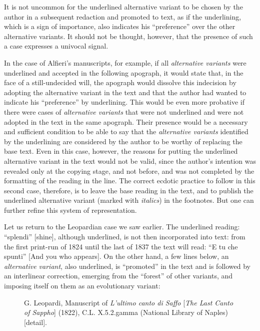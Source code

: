 \begin{paper}
It is not uncommon for the underlined alternative variant to be chosen
by the author in a subsequent redaction and promoted to text, as if the
underlining, which is a sign of importance, also indicates his
``preference'' over the other alternative variants. It should not be
thought, however, that the presence of such a case expresses a univocal
signal.

In the case of Alfieri's manuscripts, for example, if all
\emph{alternative variants} were underlined and accepted in the
following apograph, it would state that, in the face of a
still-undecided will, the apograph would dissolve this indecision by
adopting the alternative variant in the text and that the author had
wanted to indicate his ``preference'' by underlining. This would be even
more probative if there were cases of \emph{alternative variants} that
were not underlined and were not adopted in the text in the same
apograph. Their presence would be a necessary and sufficient condition
to be able to say that the \emph{alternative variants} identified by the
underlining are considered by the author to be worthy of replacing the
base text. Even in this case, however, the reasons for putting the
underlined alternative variant in the text would not be valid, since the
author's intention was revealed only at the copying stage, and not
before, and was not completed by the formatting of the reading in the
line. The correct ecdotic practice to follow in this second case,
therefore, is to leave the base reading in the text, and to publish the
underlined alternative variant (marked with \emph{italics}) in the
footnotes. But one can further refine this system of representation.

Let us return to the Leopardian case we saw earlier. The underlined
reading: ``splendi'' [shine], although underlined, is not then
incorporated into text: from the first print-run of 1824 until the last
of 1837 the text will read: ``E tu che spunti'' [And you who appears].
On the other hand, a few lines below, an \emph{alternative variant},
also underlined, is ``promoted'' in the text and is followed by an
interlinear correction, emerging from the ``forest'' of other variants,
and imposing itself on them as an evolutionary variant:

\begin{figure}[H]
    \centering
    \caption{G. Leopardi, Manuscript of \emph{L'ultimo canto di Saffo}
[\emph{The Last Canto of Sappho}] (1822), C.L. X.5.2.gamma (National
Library of Naples) {[}detail{]}.}
    \label{fig:italia7}
\end{figure}


\end{paper}
